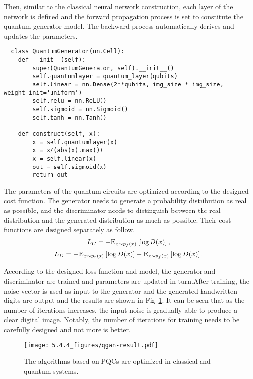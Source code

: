 Then, similar to the classical neural network construction, each layer of the network is defined and the forward propagation process is set to constitute the quantum generator model. The backward process automatically derives and updates the parameters.
\begin{lstlisting}
  class QuantumGenerator(nn.Cell):
    def __init__(self):
        super(QuantumGenerator, self).__init__()
        self.quantumlayer = quantum_layer(qubits)
        self.linear = nn.Dense(2**qubits, img_size * img_size, weight_init='uniform')
        self.relu = nn.ReLU()
        self.sigmoid = nn.Sigmoid()
        self.tanh = nn.Tanh()

    def construct(self, x):
        x = self.quantumlayer(x)
        x = x/(abs(x).max())
        x = self.linear(x)
        out = self.sigmoid(x)
        return out
\end{lstlisting}

The parameters of the quantum circuits are optimized according to the designed cost function. The generator needs to generate a probability distribution as real as possible, and the discriminator needs to distinguish between the real distribution and the generated distribution as much as possible. Their cost functions are designed separately as follow.
\begin{equation}
  {L_G} =  - {{\rm E}_{x\sim{p_f}(x)}}\left[ {\log D(x)} \right],
\end{equation}
\begin{equation}
  {L_D} =  - {{\rm E}_{x\sim{p_r}(x)}}\left[ {\log D(x)} \right] - {{\rm E}_{x\sim{p_f}(x)}}\left[ {\log D(x)} \right].
\end{equation}

According to the designed loss function and model, the generator and discriminator are trained and parameters are updated in turn.After training, the noise vector is used as input to the generator and the generated handwritten digits are output and the results are shown in Fig~\ref{qgan-result}. It can be seen that as the number of iterations increases, the input noise is gradually able to produce a clear digital image. Notably, the number of iterations for training needs to be carefully designed and not more is better.
\begin{figure}[htbp]
  \centering
  \texttt{[image: 5.4.4\_figures/qgan-result.pdf]}
  \caption{\label{qgan-result} The algorithms based on PQCs are optimized in classical and quantum systems.}
\end{figure}